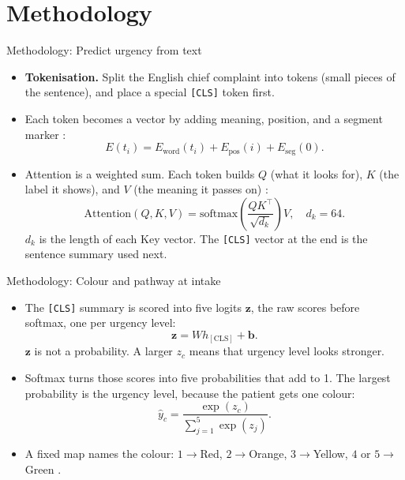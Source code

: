\section{Methodology}

\begin{frame}{Methodology: Predict urgency from text}
	\footnotesize
	\setlength{\abovedisplayskip}{4pt}
	\setlength{\belowdisplayskip}{4pt}
	\begin{itemize}\setlength\itemsep{0.25em}
		\item \textbf{Tokenisation.} Split the English chief complaint into tokens (small pieces of the sentence), and place a special \texttt{[CLS]} token first.
		\item Each token becomes a vector by adding meaning, position, and a segment marker \citep{lee2020biobert}:
		\begin{equation}
		  E(t_i) = E_{\mathrm{word}}(t_i) + E_{\mathrm{pos}}(i) + E_{\mathrm{seg}}(0).
		  \tag{1}
		\end{equation}
		\item Attention is a weighted sum. Each token builds \(Q\) (what it looks for), \(K\) (the label it shows), and \(V\) (the meaning it passes on) \citep{vaswani2017attention}:
		\begin{equation}
		  \mathrm{Attention}(Q,K,V)
		  = \mathrm{softmax}\!\left(\frac{QK^{\top}}{\sqrt{d_k}}\right)V,
		  \quad d_k=64.
		  \tag{2}
		\end{equation}
		\(d_k\) is the length of each Key vector.
		The \texttt{[CLS]} vector at the end is the sentence summary used next.
	\end{itemize}
\end{frame}

\begin{frame}{Methodology: Colour and pathway at intake}
	\footnotesize
	\setlength{\abovedisplayskip}{4pt}
	\setlength{\belowdisplayskip}{4pt}
	\begin{itemize}\setlength\itemsep{0.25em}
		\item The \texttt{[CLS]} summary is scored into five logits \(\mathbf{z}\), the raw scores before softmax, one per urgency level:
		\begin{equation}
		  \mathbf{z} = W h_{\mathrm{[CLS]}} + \mathbf{b}.
		  \tag{3}
		\end{equation}
		\(\mathbf{z}\) is not a probability. A larger \(z_c\) means that urgency level looks stronger.
		\item Softmax turns those scores into five probabilities that add to 1. The largest probability is the urgency level, because the patient gets one colour:
		\begin{equation}
		  \hat{y}_c = \frac{\exp(z_c)}{\sum_{j=1}^{5}\exp(z_j)}.
		  \tag{4}
		\end{equation}
		\item A fixed map names the colour: \(1\to\)Red, \(2\to\)Orange, \(3\to\)Yellow, \(4\) or \(5\to\)Green \citep{satsmanual}.
	\end{itemize}
\end{frame}

